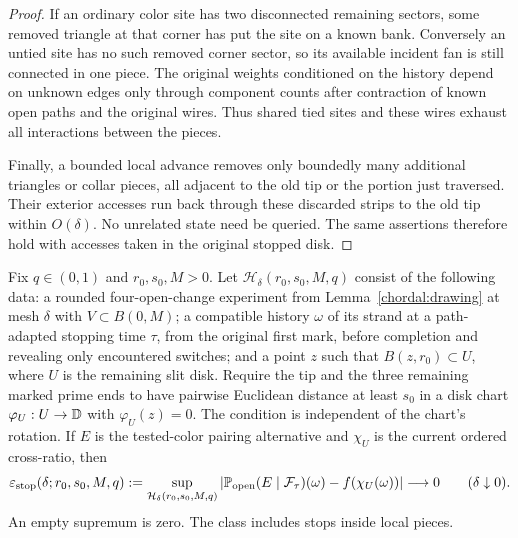 \begin{proof}
If an ordinary color site has two disconnected remaining sectors,
some removed triangle at that corner has put the site on a known
bank.  Conversely an untied site has no such removed corner sector,
so its available incident fan is still connected in one piece.
The original weights conditioned on the history depend on unknown
edges only through component counts after contraction of known
open paths and the original wires.  Thus shared tied sites and
these wires exhaust all interactions between the pieces.

Finally, a bounded local advance removes only boundedly many
additional triangles or collar pieces, all adjacent to the old tip
or the portion just traversed.  Their exterior accesses run back
through these discarded strips to the old tip within $O(\delta)$.
No unrelated state need be queried.  The same assertions therefore
hold with accesses taken in the original stopped disk.
\end{proof}

\begin{proposition}
\label{prop:slit-test}
Fix $q\in(0,1)$ and $r_0,s_0,M>0$.  Let
$\mathcal H_\delta(r_0,s_0,M,q)$ consist of the following data:
a rounded four-open-change experiment from
Lemma~\ref{chordal:drawing} at mesh $\delta$ with $V\subset B(0,M)$;
a compatible history $\omega$ of its strand at a path-adapted
stopping time $\tau$,
from the original first mark, before completion and revealing only
encountered switches; and a point $z$ such that $B(z,r_0)\subset U$,
where $U$ is the remaining slit disk.  Require the tip and the three
remaining marked prime ends to have pairwise Euclidean distance at
least $s_0$ in a disk chart $\varphi_U:U\to\mathbb D$ with $\varphi_U(z)=0$.
The condition is independent of the chart's rotation.  If $E$ is
the tested-color pairing alternative and $\chi_U$ is the current
ordered cross-ratio, then
\begin{equation}\label{chordal:stopped-test}
 \varepsilon_{\rm stop}(\delta;r_0,s_0,M,q)
 :=\sup_{\mathcal H_\delta(r_0,s_0,M,q)}
 \left|
 \mathbb P_{\rm open}(E\mid\mathcal F_\tau)(\omega)
       -f(\chi_U(\omega))
 \right|
 \longrightarrow0\qquad(\delta\downarrow0).
\end{equation}
An empty supremum is zero.  The class includes stops inside local pieces.
\end{proposition}

